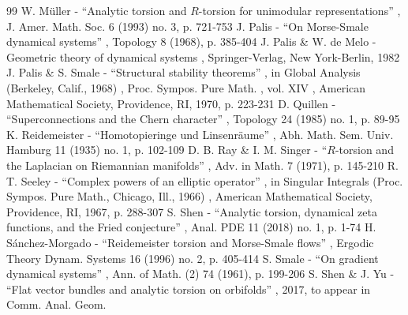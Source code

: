 \documentclass[11pt]{article}
\numberwithin{equation}{section}
\begin{document}
\begin{thebibliography}{99}
 W. Müller - “Analytic torsion and $R$-torsion for unimodular representations” , J. Amer. Math. Soc. 6 (1993) no. 3, p. 721-753
 J. Palis - “On Morse-Smale dynamical systems” , Topology 8 (1968), p. 385-404
 J. Palis \& W. de Melo - Geometric theory of dynamical systems , Springer-Verlag, New York-Berlin, 1982
 J. Palis \& S. Smale - “Structural stability theorems” , in Global Analysis (Berkeley, Calif., 1968) , Proc. Sympos. Pure Math. , vol. XIV , American Mathematical Society, Providence, RI, 1970, p. 223-231
 D. Quillen - “Superconnections and the Chern character” , Topology 24 (1985) no. 1, p. 89-95
 K. Reidemeister - “Homotopieringe und Linsenräume” , Abh. Math. Sem. Univ. Hamburg 11 (1935) no. 1, p. 102-109
 D. B. Ray \& I. M. Singer - “$R$-torsion and the Laplacian on Riemannian manifolds” , Adv. in Math. 7 (1971), p. 145-210
 R. T. Seeley - “Complex powers of an elliptic operator” , in Singular Integrals (Proc. Sympos. Pure Math., Chicago, Ill., 1966) , American Mathematical Society, Providence, RI, 1967, p. 288-307
 S. Shen - “Analytic torsion, dynamical zeta functions, and the Fried conjecture” , Anal. PDE 11 (2018) no. 1, p. 1-74
 H. Sánchez-Morgado - “Reidemeister torsion and Morse-Smale flows” , Ergodic Theory Dynam. Systems 16 (1996) no. 2, p. 405-414
 S. Smale - “On gradient dynamical systems” , Ann. of Math. (2) 74 (1961), p. 199-206
 S. Shen \& J. Yu - “Flat vector bundles and analytic torsion on orbifolds” , 2017, to appear in Comm. Anal. Geom.
\end{thebibliography}
\end{document}
